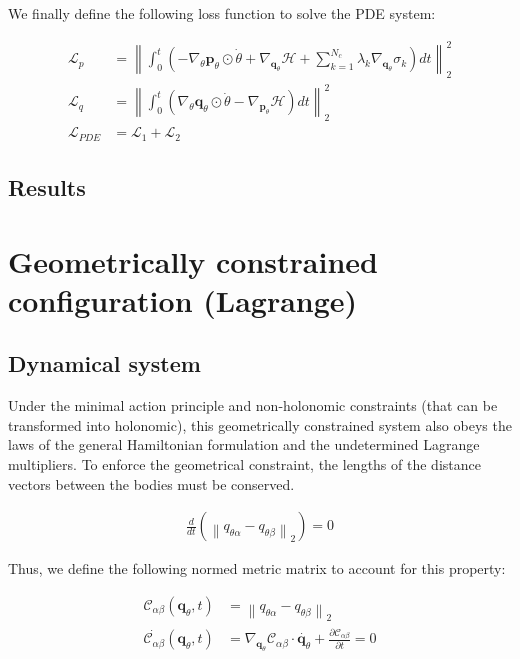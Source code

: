 \documentclass[draft]{agujournal2019}
\newcommand{\norm}[1]{\left\lVert#1\right\rVert}
\begin{document}
We finally define the following loss function to solve the PDE system:

\begin{align*}
    \mathcal{L}_{p} &= \norm{\int_0^t \left(- \nabla_\theta \mathbf{p}_\theta \odot \dot{\theta} + \nabla_{\mathbf{q}_\theta} \mathcal{H} + \sum_{k = 1}^{N_c} \lambda_k \nabla_{\mathbf{q}_\theta} \sigma_k\right) dt}_2^2 \\
    \mathcal{L}_{q} &= \norm{\int_0^t \left(\nabla_\theta \mathbf{q}_\theta \odot \dot{\theta} - \nabla_{\mathbf{p}_\theta} \mathcal{H}\right) dt}^2_2 \\
    \mathcal{L}_{PDE} &= \mathcal{L}_1 + \mathcal{L}_2
\end{align*}

\subsection{Results}
\section{Geometrically constrained configuration (Lagrange)}
\subsection{Dynamical system}
Under the minimal action principle and non-holonomic constraints (that can be transformed into holonomic), this geometrically constrained system also obeys the laws of the general Hamiltonian formulation and the undetermined Lagrange multipliers. To enforce the geometrical constraint, the lengths of the distance vectors between the bodies must be conserved.

\begin{align*}
    \frac{d}{dt} \left( \norm{q_{\theta\alpha} - q_{\theta\beta}}_2\right) = 0
\end{align*}

Thus, we define the following normed metric matrix to account for this property:

\begin{align*}
    \mathcal{C}_{\alpha\beta}(\mathbf{q}_\theta, t) &= \norm{q_{\theta\alpha} - q_{\theta\beta}}_2 \\
    \dot{\mathcal{C}_{\alpha\beta}}\left(\mathbf{q}_\theta, t\right) &= \nabla_{\mathbf{q}_\theta} \mathcal{C}_{\alpha\beta} \cdot \dot{\mathbf{q}_\theta} + \frac{\partial \mathcal{C}_{\alpha\beta}}{\partial t} = 0
\end{align*}
\end{document}
